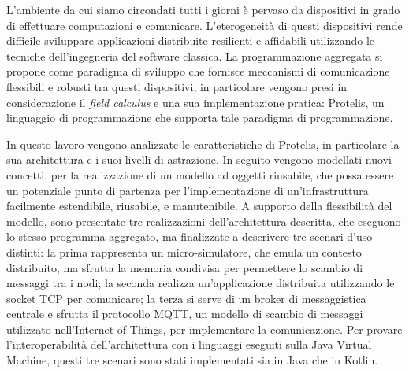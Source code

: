 L'ambiente da cui siamo circondati tutti i giorni è pervaso da dispositivi in
grado di effettuare computazioni e comunicare. L'eterogeneità di questi
dispositivi rende difficile sviluppare applicazioni distribuite resilienti e
affidabili utilizzando le tecniche dell'ingegneria del software classica. La
programmazione aggregata si propone come paradigma di sviluppo che fornisce
meccanismi di comunicazione flessibili e robusti tra questi dispositivi, in
particolare vengono presi in considerazione il \textit{field calculus} e una sua
implementazione pratica: Protelis, un linguaggio di programmazione che supporta
tale paradigma di programmazione.

In questo lavoro vengono analizzate le caratteristiche di Protelis, in
particolare la sua architettura e i suoi livelli di astrazione. In seguito
vengono modellati nuovi concetti, per la realizzazione di un modello ad oggetti
riusabile, che possa essere un potenziale punto di partenza per
l'implementazione di un'infrastruttura facilmente estendibile, riusabile, e
manutenibile. A supporto della flessibilità del modello, sono presentate tre
realizzazioni dell'architettura descritta, che eseguono lo stesso programma
aggregato, ma finalizzate a descrivere tre scenari d'uso distinti: la prima
rappresenta un micro-simulatore, che emula un contesto distribuito, ma sfrutta
la memoria condivisa per permettere lo scambio di messaggi tra i nodi; la
seconda realizza un'applicazione distribuita utilizzando le socket TCP per
comunicare; la terza si serve di un broker di messaggistica centrale e sfrutta
il protocollo MQTT, un modello di scambio di messaggi utilizzato
nell'Internet-of-Things, per implementare la comunicazione. Per provare
l'interoperabilità dell'architettura con i linguaggi eseguiti sulla Java Virtual
Machine, questi tre scenari sono stati implementati sia in Java che in Kotlin.




